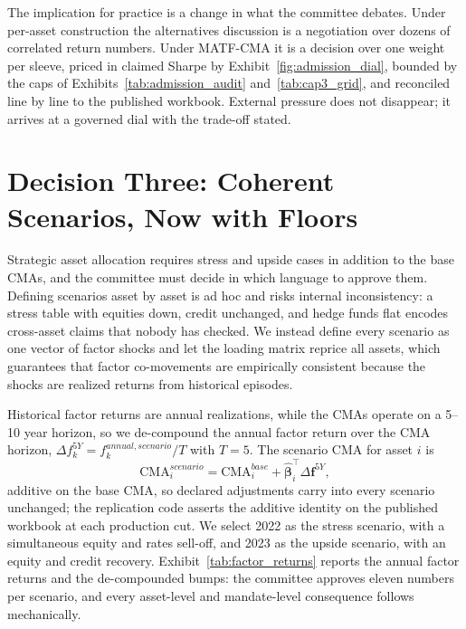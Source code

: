 \documentclass[pdftex,12pt,a4paper]{article}
\begin{document}
The implication for practice is a change in what the committee debates. Under per-asset construction the alternatives discussion is a negotiation over dozens of correlated return numbers. Under MATF-CMA it is a decision over one weight per sleeve, priced in claimed Sharpe by Exhibit~\ref{fig:admission_dial}, bounded by the caps of Exhibits~\ref{tab:admission_audit} and~\ref{tab:cap3_grid}, and reconciled line by line to the published workbook. External pressure does not disappear; it arrives at a governed dial with the trade-off stated.


\sectionfont{\MakeUppercase}
\section*{Decision Three: Coherent Scenarios, Now with Floors}\label{sec:scenarios}

Strategic asset allocation requires stress and upside cases in addition to the base CMAs, and the committee must decide in which language to approve them. Defining scenarios asset by asset is ad hoc and risks internal inconsistency: a stress table with equities down, credit unchanged, and hedge funds flat encodes cross-asset claims that nobody has checked. We instead define every scenario as one vector of factor shocks and let the loading matrix reprice all assets, which guarantees that factor co-movements are empirically consistent because the shocks are realized returns from historical episodes.

Historical factor returns are annual realizations, while the CMAs operate on a 5--10 year horizon, so we de-compound the annual factor return over the CMA horizon, $\Delta f_k^{5Y} = f_k^{annual,scenario}/T$ with $T=5$. The scenario CMA for asset $i$ is
\begin{equation}\label{eq:cma_scenario}
	\text{CMA}_i^{scenario} = \text{CMA}_i^{base} + \hat{\boldsymbol\beta}_i^{\intercal} \Delta \boldsymbol f^{5Y},
\end{equation}
additive on the base CMA, so declared adjustments carry into every scenario unchanged; the replication code asserts the additive identity on the published workbook at each production cut. We select 2022 as the stress scenario, with a simultaneous equity and rates sell-off, and 2023 as the upside scenario, with an equity and credit recovery. Exhibit~\ref{tab:factor_returns} reports the annual factor returns and the de-compounded bumps: the committee approves eleven numbers per scenario, and every asset-level and mandate-level consequence follows mechanically.
\end{document}
